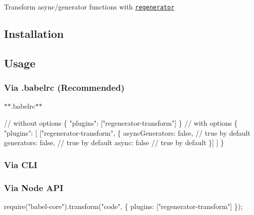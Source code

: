 Transform async/generator functions with \href{https://github.com/facebook/regenerator}{\tt regenerator}

\subsection*{Installation}




\subsection*{Usage}

\subsubsection*{Via {\ttfamily .babelrc} (Recommended)}

$\ast$$\ast$.babelrc$\ast$$\ast$


\begin{DoxyCode}
// without options
\{
  "plugins": ["regenerator-transform"]
\}
// with options
\{
  "plugins": [
    ["regenerator-transform", \{
      asyncGenerators: false, // true by default
      generators: false, // true by default
      async: false // true by default
    \}]
  ]
\}
\end{DoxyCode}


\subsubsection*{Via C\+LI}




\subsubsection*{Via Node A\+PI}


\begin{DoxyCode}
require("babel-core").transform("code", \{
  plugins: ["regenerator-transform"]
\});
\end{DoxyCode}
 